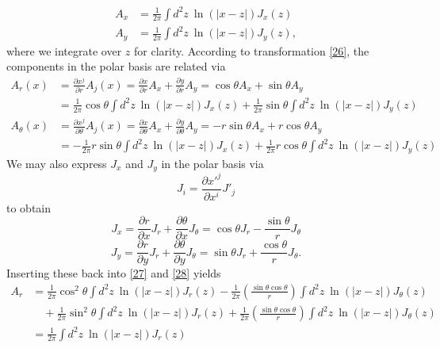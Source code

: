 \documentclass[10pt,letterpaper]{article}
\begin{document}
\begin{align*}
A_x &= \frac{1}{2\pi} \int d^2z\ \ln(|x- z|) J_x(z)\\
A_y &= \frac{1}{2\pi} \int d^2z\ \ln(|x- z|) J_y(z),
\end{align*}
where we integrate over $z$ for clarity. According to transformation \eqref{26}, the components in the polar basis are related via
\begin{align}
A_r(x) &= \frac{\partial x^j}{\partial r}A_j(x) = \frac{\partial x}{\partial r}A_x+\frac{\partial y}{\partial r}A_y = \cos\theta A_x + \sin\theta A_y\nonumber\\
&= \frac{1}{2\pi} \cos\theta  \int d^2z\ \ln(|x- z|) J_x(z)+ \frac{1}{2\pi} \sin\theta  \int d^2z\ \ln(|x- z|) J_y(z) \label{27}
\end{align}
\begin{align}
A_\theta(x) &= \frac{\partial x^j}{\partial \theta}A_j(x) = \frac{\partial x}{\partial \theta}A_x+\frac{\partial y}{\partial \theta }A_y = -r\sin\theta A_x + r\cos\theta A_y\nonumber\\
&=  -\frac{1}{2\pi} r\sin\theta  \int d^2z\ \ln(|x- z|) J_x(z)+\frac{1}{2\pi} r\cos\theta  \int d^2z\ \ln(|x- z|) J_y(z) \label{28}
\end{align}
We may also express $J_x$ and $J_y$ in the polar basis via
\[
	J_i = \frac{\partial x'^j}{\partial x^i}J'_j
\]
to obtain
\begin{equation}
J_x = \frac{\partial r}{\partial x}J_r + \frac{\partial \theta}{\partial x} J_\theta = \cos\theta J_r - \frac{\sin\theta}{r} J_\theta
\end{equation}
\begin{equation}
J_y = \frac{\partial r}{\partial y}J_r + \frac{\partial \theta}{\partial y} J_\theta = \sin\theta J_r + \frac{\cos\theta}{r} J_\theta.
\end{equation}
Inserting these back into \eqref{27} and \eqref{28} yields
\begin{align}
A_r &= \frac{1}{2\pi} \cos^2\theta  \int d^2z\ \ln(|x- z|) J_r(z) - \frac{1}{2\pi} \left(\frac{\sin\theta \cos\theta}{r}\right) \int d^2z\ \ln(|x- z|) J_\theta(z)\\
&\quad+ \frac{1}{2\pi} \sin^2\theta \int d^2z\ \ln(|x- z|) J_r(z) + \frac{1}{2\pi} \left(\frac{\sin\theta\cos\theta}{r}\right)  \int d^2z\ \ln(|x- z|) J_\theta(z)\\
&= \frac{1}{2\pi}  \int d^2z\ \ln(|x- z|) J_r (z)
\end{align}
\end{document}
